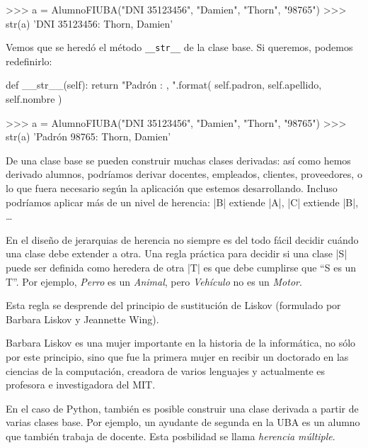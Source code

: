\begin{codigo-python-sn}
>>> a = AlumnoFIUBA("DNI 35123456", "Damien", "Thorn", "98765")
>>> str(a)
'DNI 35123456: Thorn, Damien'
\end{codigo-python-sn}

Vemos que se heredó el método \lstinline+__str__+ de la clase base. Si
queremos, podemos redefinirlo:

\begin{codigo-python-sn}
    def __str__(self):
        return "Padrón {}: {}, {}".format(
            self.padron, self.apellido, self.nombre
        )
\end{codigo-python-sn}

\begin{codigo-python-sn}
>>> a = AlumnoFIUBA("DNI 35123456", "Damien", "Thorn", "98765")
>>> str(a)
'Padrón 98765: Thorn, Damien'
\end{codigo-python-sn}

De una clase base se pueden construir muchas clases derivadas: así como
hemos derivado alumnos, podríamos derivar docentes, empleados, clientes,
proveedores, o lo que fuera necesario según la aplicación que estemos
desarrollando. Incluso podríamos aplicar más de un nivel de herencia: |B|
extiende |A|, |C| extiende |B|, \ldots

\begin{sabias_que}
En el diseño de jerarquias de herencia no siempre es del todo fácil decidir
cuándo una clase debe extender a otra.
Una regla práctica para decidir si una clase |S| puede ser
definida como heredera de otra |T| es que debe cumplirse que ``S es un T''.
Por ejemplo, {\it Perro} es un {\it Animal}, pero {\it Vehículo} no es un {\it
Motor}.

Esta regla se desprende del principio de sustitución de Liskov (formulado por
Barbara Liskov y Jeannette Wing).

Barbara Liskov es una mujer importante en la historia de la informática, no
sólo por este principio, sino que fue la primera mujer en recibir un doctorado
en las ciencias de la computación, creadora de varios lenguajes y actualmente
es profesora e investigadora del MIT.
\end{sabias_que}

En el caso de Python, también es posible construir una clase derivada a partir
de varias clases base. Por ejemplo, un ayudante de segunda en la UBA es un
alumno que también trabaja de docente.  Esta posbilidad se llama {\it herencia
múltiple}.

